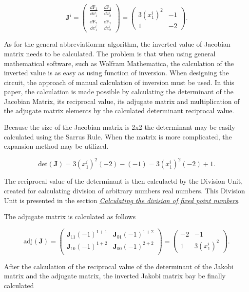 \documentclass[a4paper, twoside, 11pt]{article}
\begin{document}
    \begin{equation}
        \textbf{J}^i = 
        \begin{pmatrix}
            \frac{\dd \text{F}_1}{\dd x_1^i} & \frac{\dd \text{F}_1}{\dd x_2^i}\\
            \frac{\dd \text{F}_2}{\dd x_1^i} & \frac{\dd \text{F}_2}{\dd x_2^i}
        \end{pmatrix}
        =
        \begin{pmatrix}
            3 (x_1^i)^2 & -1\\
            1 & -2
        \end{pmatrix}.
    \end{equation}

    As for the general \gls{abbreviation:nr} algorithm, the inverted value of Jacobian matrix needs to be calculated. The problem is that when using general mathematical software, such as Wolfram Mathematica, the calculation of the inverted value is as easy as using function of inversion. When designing the circuit, the approach of manual calculation of inversion must be used. In this paper, the calculation is made possible by calculating the determinant of the Jacobian Matrix, its reciprocal value, its adjugate matrix and multiplication of the adjugate matrix elements by the calculated determinant reciprocal value.\par
    Because the size of the Jacobian matrix is 2x2 the determinant may be easily calculated using the Sarrus Rule. When the matrix is more complicated, the expansion method may be utilized.

    \begin{equation}
        \text{det}(\textbf{J}) = 3 (x_1^i)^2 (-2) - (-1) = 3 (x_1^i)^2 (-2) + 1.
    \end{equation}

    The reciprocal value of the determinant is then calculaetd by the Division Unit, created for calculating division of arbitrary numbers real numbers. This Division Unit is presented in the section \hyperref[sec:calculating-the-division-of-fixed-point-numbers]{\textit{Calculating the division of fixed point numbers}}.\par
The adjugate matrix is calculated as follows

    \begin{equation}
        \text{adj}(\textbf{J}) =
        \begin{pmatrix}
            \textbf{J}_{11} (-1)^{1+1} & \textbf{J}_{01} (-1)^{1+2}\\

            \textbf{J}_{10} (-1)^{1+2} & \textbf{J}_{00} (-1)^{2+2}\\
        \end{pmatrix} =
        \begin{pmatrix}
            -2 & -1\\
            1 & 3 (x_1^i)^2
        \end{pmatrix}.
    \end{equation}
\par
    After the calculation of the reciprocal value of the determinant of the Jakobi matrix and the adjugate matrix, the inverted Jakobi matrix bay be finally calculated
\end{document}
